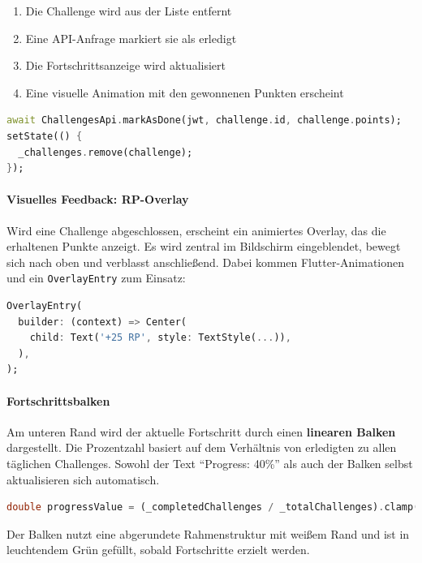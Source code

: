 \documentclass[11pt,a4paper]{article}
\begin{document}
\begin{enumerate}
    \item Die Challenge wird aus der Liste entfernt
    \item Eine API-Anfrage markiert sie als erledigt
    \item Die Fortschrittsanzeige wird aktualisiert
    \item Eine visuelle Animation mit den gewonnenen Punkten erscheint
\end{enumerate}

\begin{lstlisting}[language=Dart, caption=Challenge als erledigt markieren]
await ChallengesApi.markAsDone(jwt, challenge.id, challenge.points);
setState(() {
  _challenges.remove(challenge);
});
\end{lstlisting}

\paragraph{Visuelles Feedback: RP-Overlay}
Wird eine Challenge abgeschlossen, erscheint ein animiertes Overlay, das die erhaltenen Punkte anzeigt. Es wird zentral im Bildschirm eingeblendet, bewegt sich nach oben und verblasst anschließend. Dabei kommen Flutter-Animationen und ein \texttt{OverlayEntry} zum Einsatz:

\begin{lstlisting}[language=Dart, caption=Overlay mit Punktanzeige bei Erfolg]
OverlayEntry(
  builder: (context) => Center(
    child: Text('+25 RP', style: TextStyle(...)),
  ),
);
\end{lstlisting}

\paragraph{Fortschrittsbalken}
Am unteren Rand wird der aktuelle Fortschritt durch einen \textbf{linearen Balken} dargestellt. Die Prozentzahl basiert auf dem Verhältnis von erledigten zu allen täglichen Challenges. Sowohl der Text ``Progress: 40\%'' als auch der Balken selbst aktualisieren sich automatisch.

\begin{lstlisting}[language=Dart, caption=Berechnung des Fortschrittswertes]
double progressValue = (_completedChallenges / _totalChallenges).clamp(0.0, 1.0);
\end{lstlisting}

Der Balken nutzt eine abgerundete Rahmenstruktur mit weißem Rand und ist in leuchtendem Grün gefüllt, sobald Fortschritte erzielt werden.
\end{document}

